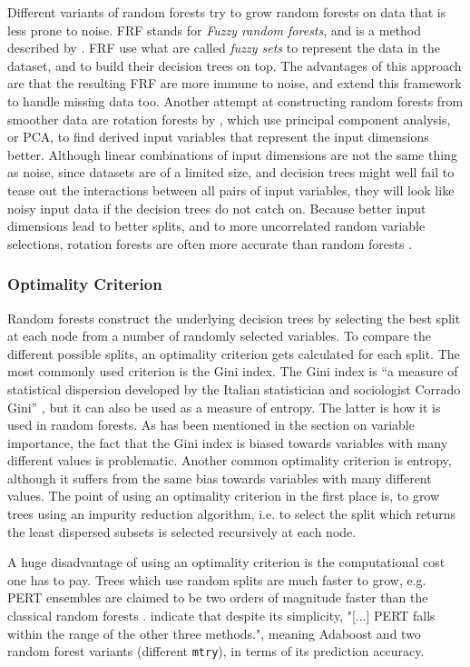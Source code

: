 \documentclass[a4paper,man,12pt,apacite,floatsintext,draftfirst]{apa6} %
\begin{document}
Different variants of random forests try to grow random forests on data
that is less prone to noise.
FRF stands for \emph{Fuzzy random forests}, and is a method described by
.
FRF use what are called \emph{fuzzy sets} to represent the data in the dataset,
and to build their decision trees on top.
The advantages of this approach are that the resulting FRF are more immune
to noise, and  extend this framework to
handle missing data too.
Another attempt at constructing random forests from smoother data are
rotation forests by \cite{rodriguez2006rotation}, which use
principal component analysis, or PCA, to find derived input variables that
represent the input dimensions better.
Although linear combinations of input dimensions are not the same thing
as noise, since datasets are of a limited size, and decision trees
might well fail to tease out the interactions between all pairs of input
variables, they will look like noisy input data if the decision trees
do not catch on.
Because better input dimensions lead to better splits, and to more
uncorrelated random variable selections, rotation forests are often more
accurate than random forests \cite{rodriguez2006rotation}.

\subsubsection{Optimality Criterion}
Random forests construct the underlying decision trees by selecting the
best split at each node from a number of randomly selected variables.
To compare the different possible splits, an optimality criterion gets
calculated for each split.
The most commonly used criterion is the Gini index.
The Gini index is “a measure of statistical dispersion developed by the
Italian statistician and sociologist Corrado Gini” \cite{wpGINI},
but it can also be used as a measure of entropy.
The latter is how it is used in random forests.
As has been mentioned in the section on variable importance, the fact that
the Gini index is biased towards variables with many different values
is problematic.
Another common optimality criterion is entropy, although it suffers from
the same bias towards variables with many different values.
The point of using an optimality criterion in the first place is,
to grow trees using an impurity reduction algorithm, i.e. to select the split
which returns the least dispersed subsets is selected recursively at each node.

A huge disadvantage of using an optimality criterion is the computational cost
one has to pay.
Trees which use random splits are much faster to grow, e.g. PERT ensembles
are claimed to be two orders of magnitude faster than the classical
random forests \cite{cutler2001pert}.
 indicate that despite its simplicity,
"[...] PERT falls within the range of the other three methods.", meaning
Adaboost and two random forest variants (different \texttt{mtry}),
in terms of its prediction accuracy.
\end{document}
